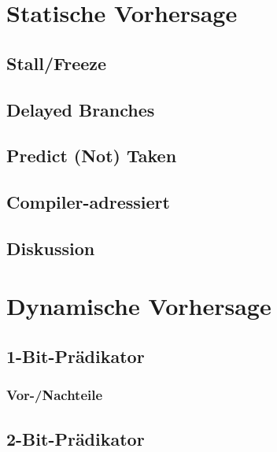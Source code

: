 
\section{Statische Vorhersage}
\subsection{Stall/Freeze}
\subsection{Delayed Branches}
\subsection{Predict (Not) Taken}

\subsection{Compiler-adressiert}

\subsection{Diskussion}

\section{Dynamische Vorhersage}

\subsection{1-Bit-Prädikator}
\subsubsection{Vor-/Nachteile}

\subsection{2-Bit-Prädikator}
